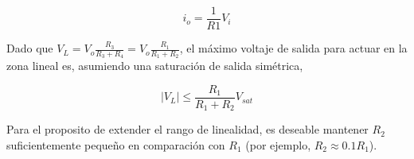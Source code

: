 \begin{equation}
    \boxed{i_o = \frac{1}{R1} V_i}
\end{equation}

Dado que $V_L = V_o \frac{R_3}{R_3 + R_4} = V_o \frac{R_1}{R_1 + R_2}$, el máximo  voltaje de salida para actuar en la zona lineal es, asumiendo una saturación de salida simétrica,  

\begin{equation}
    \left| V_L \right| \leq  \frac{R_1}{R_1 + R_2} V_{sat}
\end{equation}

Para el proposito de extender el rango de linealidad, es deseable mantener $R_2$ suficientemente pequeño en comparación	con $R_1$ (por ejemplo, $R_2 \approx 0.1 R_1$).
